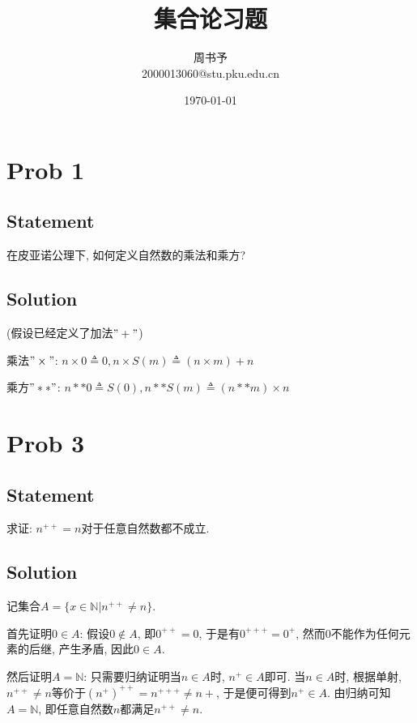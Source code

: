 \documentclass[UTF-8]{ctexart}
\title{\heiti\zihao{1} 集合论习题}
\author{\kaishu\zihao{-3} 周书予\\2000013060@stu.pku.edu.cn}
\date{\today}
\begin{document}
\maketitle

\section{Prob 1}
\subsection{Statement}
在皮亚诺公理下, 如何定义自然数的乘法和乘方?
\subsection{Solution}
(假设已经定义了加法$"+"$)

乘法$"\times"$: $n \times 0 \triangleq 0, n \times S(m) \triangleq (n \times m) + n$

乘方$"**"$: $n ** 0 \triangleq S(0), n ** S(m) \triangleq (n ** m) \times n$

\section{Prob 3}
\subsection{Statement}
求证: $n^{++} = n$对于任意自然数都不成立.
\subsection{Solution}
记集合$A = \{x \in \mathbb N | n^{++} \neq n\}$.

首先证明$0 \in A$: 假设$0 \notin A$, 即$0^{++} = 0$, 于是有$0^{+++} = 0^+$, 然而$0$不能作为任何元素的后继, 产生矛盾, 因此$0 \in A$.

然后证明$A = \mathbb N$: 只需要归纳证明当$n \in A$时, $n^+ \in A$即可. 当$n \in A$时, 根据单射, $n^{++} \neq n$等价于$(n^+)^{++} = n^{+++} \neq n+$, 于是便可得到$n^+ \in A$. 由归纳可知$A = \mathbb N$, 即任意自然数$n$都满足$n^{++} \neq n$.
\end{document}
